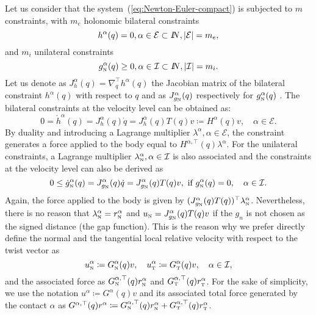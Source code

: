 Let us consider that the system~(\ref{eq:Newton-Euler-compact}) is  subjected to $m$ constraints, with $m_{e}$ holonomic bilateral 
constraints
\begin{equation}
  \label{eq:bilateral-constraints}
  h^\alpha(q)=0, \alpha \in \mathcal{E}\subset\mbox{\rm $I\!\!N$},  |\mathcal E| = m_e,
\end{equation}
and  $m_{i}$ unilateral constraints
\begin{equation}
  \label{eq:unilateral-constraints}
  g_{{\hbox{\tiny{N}}}}^\alpha(q)\geq 0, \alpha \in \mathcal{I}\subset\mbox{\rm $I\!\!N$},  |\mathcal I| = m_i.
\end{equation} 
%
Let us denote as $J^\alpha_h(q) = \nabla^\top_q h^\alpha(q)  $ the Jacobian matrix of the bilateral constraint $h^\alpha(q)$ with respect to $q$ and as $J^\alpha_{g_{\hbox{\tiny{N}}}}(q)$ respectively for $g_{{\hbox{\tiny{N}}}}^\alpha(q)$  .
%
The bilateral constraints at the velocity level can be obtained as:
\begin{equation}
  \label{eq:bilateral-constraints-velocity}
 0 = \dot h^\alpha(q)= J^\alpha_h(q)\dot q = J^\alpha_h(q) T(q) v \coloneqq H^\alpha(q)  v,\quad  \alpha \in \mathcal{E}.
\end{equation}
By duality and introducing a Lagrange multiplier $\lambda^\alpha, \alpha \in \mathcal E$, the constraint generates a force applied to the body equal to $H^{\alpha,\top}(q)\lambda^\alpha$. For the unilateral constraints, a Lagrange multiplier $\lambda_{{\hbox{\tiny{N}}}}^\alpha, \alpha \in \mathcal I$ is also associated and the constraints at the velocity level can also be derived as
\begin{equation}
  \label{eq:unilateral-constraints-velocity}
 0 \leq  \dot g_{\hbox{\tiny{N}}}^\alpha(q)= J^\alpha_{g_{\hbox{\tiny{N}}}}(q) \dot q = J^\alpha_{g_{\hbox{\tiny{N}}}}(q)  T(q) v , \text{ if } g_{{\hbox{\tiny{N}}}}^\alpha(q) = 0,\quad  \alpha \in \mathcal{I}. 
\end{equation}
Again, the force applied to the body is given by $(J^\alpha_{g_{\hbox{\tiny{N}}}}(q) T(q))^\top\lambda^\alpha_{\hbox{\tiny{N}}}$. {Nevertheless, there is no reason that $\lambda^\alpha_{\hbox{\tiny{N}}} =r^\alpha_{\hbox{\tiny{N}}}$ and $u_{\hbox{\tiny{N}}} = J^\alpha_{g_{\hbox{\tiny{N}}}}(q) T(q) v$ if the $g_n$ is not chosen as the signed distance (the gap function)}. This is the reason why  we prefer  directly define the normal and the tangential local relative velocity with respect to the {twist vector} as
\begin{equation}
  \label{eq:unilateral-constraints-velocity-kinematic1}
   u^\alpha_{\hbox{\tiny{N}}}  \coloneqq G_{\hbox{\tiny{N}}}^\alpha(q) v, \quad u^\alpha_{\hbox{\tiny{T}}}  \coloneqq G_{\hbox{\tiny{T}}}^\alpha(q) v, \quad \alpha \in \mathcal{I},
\end{equation}
and the associated force as $G_{\hbox{\tiny{N}}}^{\alpha,\top}(q) r^{\alpha}_{\hbox{\tiny{N}}} $ and $G_{\hbox{\tiny{T}}}^{\alpha,\top}(q) r^{\alpha}_{\hbox{\tiny{T}}}$. For the sake of simplicity, we use the notation $u^\alpha  \coloneqq G^\alpha(q) v$ and its associated total force generated by the contact $\alpha$ as $G^{\alpha,\top}(q) r^{\alpha} \coloneqq G_{\hbox{\tiny{N}}}^{\alpha,\top}(q) r^{\alpha}_{\hbox{\tiny{N}}} + G_{\hbox{\tiny{T}}}^{\alpha,\top}(q) r^{\alpha}_{\hbox{\tiny{T}}} $.

